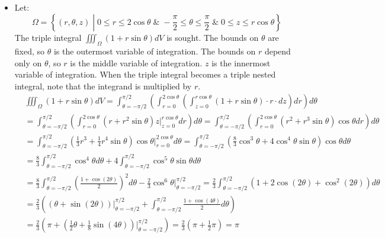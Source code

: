 \documentclass{article}
\begin{document}
\begin{itemize}
\item Let:
\[\Omega = \left\{(r,\theta,z) \middle| 0 \leq r \leq 2\cos\theta \;\&\; -\frac{\pi}{2} \leq \theta \leq \frac{\pi}{2} \;\&\; 0 \leq z \leq r\cos\theta \right\}\]
The triple integral \(\iiint_{\Omega} (1 + r\sin\theta)dV\) is sought. The bounds on \(\theta\) are fixed, so \(\theta\) is the outermost variable of integration. The bounds on \(r\) depend only on \(\theta\), so \(r\) is the middle variable of integration. \(z\) is the innermost variable of integration. When the triple integral becomes a triple nested integral, note that the integrand is multiplied by \(r\).
\begin{align*}
& \iiint_{\Omega} (1 + r\sin\theta) dV 
= \int_{\theta = -\pi/2}^{\pi/2} \left(\int_{r = 0}^{2\cos\theta} \left(\int_{z = 0}^{r\cos\theta} (1 + r\sin\theta) \cdot r \cdot dz\right)dr\right)d\theta \\
& = \int_{\theta = -\pi/2}^{\pi/2} \left(\int_{r = 0}^{2\cos\theta} (r + r^2 \sin\theta)z \Big|_{z = 0}^{r\cos\theta} dr\right)d\theta 
= \int_{\theta = -\pi/2}^{\pi/2} \left(\int_{r = 0}^{2\cos\theta} (r^2 + r^3\sin\theta)\cos\theta dr\right)d\theta \\  
& = \int_{\theta = -\pi/2}^{\pi/2} \left( \frac{1}{3}r^3 + \frac{1}{4}r^4\sin\theta \right)\cos\theta \Big|_{r = 0}^{2\cos\theta} d\theta  
= \int_{\theta = -\pi/2}^{\pi/2} \left( \frac{8}{3}\cos^3 \theta + 4\cos^4\theta \sin\theta \right)\cos\theta d\theta \\   
& = \frac{8}{3}\int_{\theta = -\pi/2}^{\pi/2} \cos^4\theta d\theta + 4\int_{\theta = -\pi/2}^{\pi/2} \cos^5\theta \sin\theta d\theta 
\end{align*}
\begin{align*}
& = \frac{8}{3}\int_{\theta = -\pi/2}^{\pi/2} \left(\frac{1 + \cos(2\theta)}{2}\right)^2 d\theta - \frac{2}{3}\cos^6\theta\Big|_{\theta = -\pi/2}^{\pi/2} 
= \frac{2}{3}\int_{\theta = -\pi/2}^{\pi/2} (1 + 2\cos(2\theta) + \cos^2(2\theta))d\theta \\
& = \frac{2}{3}\left((\theta + \sin(2\theta))\Big|_{\theta = -\pi/2}^{\pi/2} + \int_{\theta = -\pi/2}^{\pi/2} \frac{1 + \cos(4\theta)}{2}d\theta\right) \\
& = \frac{2}{3}\left(\pi + (\frac{1}{2}\theta + \frac{1}{8}\sin(4\theta))\Big|_{\theta = -\pi/2}^{\pi/2}\right) 
= \frac{2}{3}\left(\pi + \frac{1}{2}\pi\right) 
= \pi
\end{align*}

\end{itemize}
\end{document}
